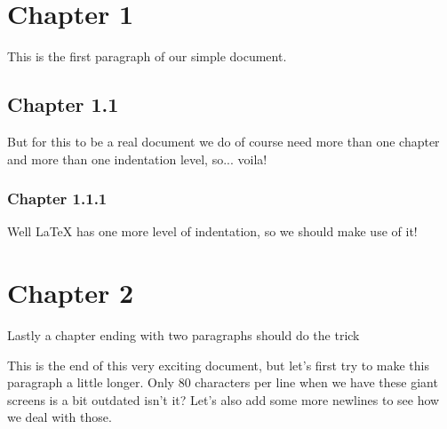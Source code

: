 \documentclass{article}
\begin{document}
\section*{Chapter 1}
This is the first paragraph of our simple document.

\subsection*{Chapter 1.1}
But for this to be a real document we do of course need more than one chapter and more than one indentation level, so... voila!

\subsubsection*{Chapter 1.1.1}
Well LaTeX has one more level of indentation, so we should make use of it!

\section*{Chapter 2}
Lastly a chapter ending with two paragraphs should do the trick

This is the end of this very exciting document, but let's first try to make this paragraph a little longer. Only 80 characters per line when we have these giant screens is a bit outdated isn't it?
Let's also add some more newlines to see how we deal with those.
\end{document}
